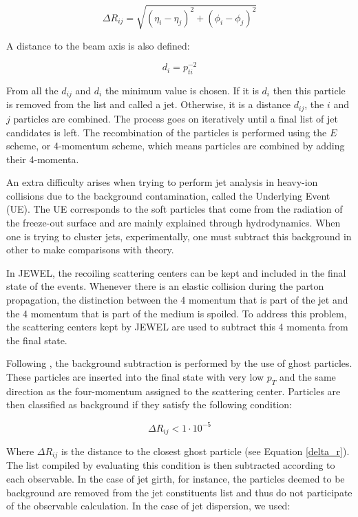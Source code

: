\begin{equation} \label{delta_r}
\Delta R_{ij} = \sqrt{ (\eta_i - \eta_j)^2 + (\phi_i - \phi_j)^2 }
\end{equation}

A distance to the beam axis is also defined:

\begin{equation}
d_i = p_{ti}^{-2}
\end{equation}

From all the $d_{ij}$ and $d_i$ the minimum value is chosen. If it is $d_i$ then this particle is removed from the list and called a jet. Otherwise, it is a distance $d_{ij}$, the $i$ and $j$ particles are combined. The process goes on iteratively until a final list of jet candidates is left. The recombination of the particles is performed using the $E$ scheme, or 4-momentum scheme, which means particles are combined by adding their 4-momenta.


An extra difficulty arises when trying to perform jet analysis in heavy-ion collisions due to the background contamination, called the Underlying Event (UE). The UE corresponds to the soft particles that come from the radiation of the freeze-out surface and are mainly explained through hydrodynamics. When one is trying to cluster jets, experimentally, one must subtract this background in other to make comparisons with theory.
\par
In JEWEL, the recoiling scattering centers can be kept and included in the final state of the events. Whenever there is an elastic collision during the parton propagation, the distinction between the 4 momentum that is part of the jet and the 4 momentum that is part of the medium is spoiled. To address this problem, the scattering centers kept by JEWEL are used to subtract this 4 momenta from the final state.
\par
Following \cite{zapp_geometrical_2014}, the background subtraction is performed by the use of ghost particles. These particles are inserted into the final state with very low $p_T$ and the same direction as the four-momentum assigned to the scattering center. Particles are then classified as background if they satisfy the following condition:

\begin{equation}
\Delta R_{ij} < 1 \cdot 10^{-5}
\end{equation}

Where $\Delta R_{ij}$ is the distance to the closest ghost particle (see Equation \eqref{delta_r}). The list compiled by evaluating this condition is then subtracted according to each observable. In the case of jet girth, for instance, the particles deemed to be background are removed from the jet constituents list and thus do not participate of the observable calculation. In the case of jet dispersion, we used:


